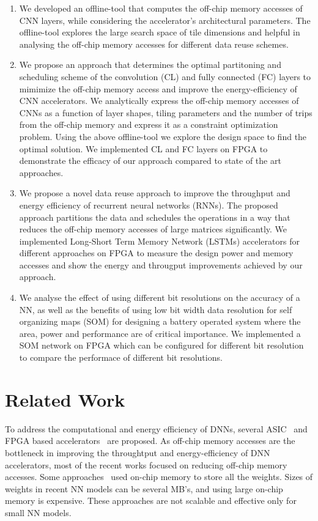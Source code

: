 \documentclass[a4paper,10pt]{article}
\begin{document}
\begin{enumerate}
	\item We developed an offline-tool that computes the off-chip memory accesses of CNN layers, while considering the accelerator's architectural parameters. The offline-tool explores the large search space of tile dimensions and helpful in analysing the off-chip memory accesses for different data reuse schemes.
	\item We propose an approach that determines the optimal partitoning and scheduling scheme of the convolution (CL) and fully connected (FC) layers to mimimize the off-chip memory access and improve the energy-efficiency of CNN accelerators. We analytically express the off-chip memory accesses of CNNs  as a function of layer shapes, tiling parameters and the number of trips from the off-chip memory and express it as a constraint optimization problem. Using the above offline-tool we explore the design space to find the optimal solution. We implemented CL and FC layers on FPGA to demonstrate the efficacy of our approach compared to state of the art approaches.  
	\item We propose a novel data reuse approach to improve the throughput and energy efficiency of recurrent neural networks (RNNs). The proposed approach partitions the data and schedules the operations in a way that reduces the off-chip memory accesses of large matrices significantly. We implemented Long-Short Term Memory Network (LSTMs) accelerators for different approaches on FPGA to measure the design power and memory accesses and show the energy and througput improvements achieved by our approach.
	\item We analyse the effect of using different bit resolutions on the accuracy of a NN, as well as the benefits of using low bit width data resolution for self organizing maps (SOM) for designing a battery operated system where the area, power and performance are of critical importance. We implemented a SOM network on FPGA which can be configured for different bit resolution to compare the performace of different bit resolutions.
\end{enumerate}

\section{Related Work}
To address the computational and energy efficiency of DNNs, several ASIC~\cite{conti2018chipmunk,wang2017accelerating,azari2020elsa} and FPGA based accelerators~\cite{chang2015recurrent,ferreira2016fpga,lee2016fpga,guan2017fpga,han2017ese} are proposed. As off-chip memory accesses are the bottleneck in improving the throughtput and energy-efficiency of DNN accelerators, most of the recent works focused on reducing off-chip memory accesses. Some approaches~\cite{lee2016fpga, rybalkin2018finn, ferreira2016fpga} used on-chip memory to store all the weights. Sizes of weights in recent NN models can be several MB's, and using large on-chip memory is expensive. These approaches are not scalable and effective only for small NN models. 
\end{document}
